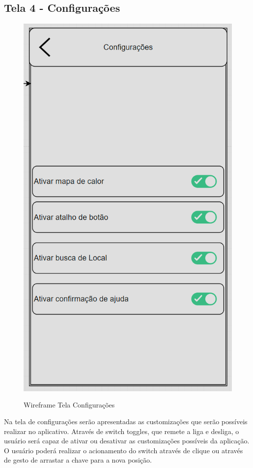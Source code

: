 \subsection{Tela 4 - Configurações}
\begin{figure}[h]
  \begin{center}
  \includegraphics[width=0.2\linewidth]{images/wire-tela-configuracoes.png}\\
  \end{center}
  \caption[Wireframe Tela Configurações]{Wireframe Tela Configurações}
  \label{fig:wireframe-tela-configuracoes}
\end{figure}
\pagebreak
Na tela de configurações serão apresentadas as customizações que serão possíveis realizar no aplicativo. Através de switch toggles, que remete a liga e desliga, o usuário será capaz de ativar ou desativar as customizações possíveis da aplicação. O usuário poderá realizar o acionamento do switch através de clique ou através de gesto de arrastar a chave para a nova posição.
